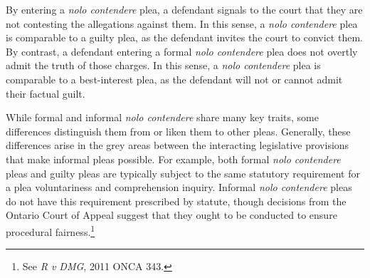 By entering a \textit{nolo contendere} plea, a defendant signals to the court that they are not contesting the allegations against them. In this sense, a \textit{nolo contendere} plea is comparable to a guilty plea, as the defendant invites the court to convict them. By contrast, a defendant entering a formal \textit{nolo contendere} plea does not overtly admit the truth of those charges. In this sense, a \textit{nolo contendere} plea is comparable to a best-interest plea, as the defendant will not or cannot admit their factual guilt.

While formal and informal \textit{nolo contendere} share many key traits, some differences distinguish them from or liken them to other pleas. Generally, these differences arise in the grey areas between the interacting legislative provisions that make informal pleas possible. For example, both formal \textit{nolo contendere} pleas and guilty pleas are typically subject to the same statutory requirement for a plea voluntariness and comprehension inquiry. Informal \textit{nolo contendere} pleas do not have this requirement prescribed by statute, though decisions from the Ontario Court of Appeal suggest that they ought to be conducted to ensure procedural fairness.\footnote{See \textit{R v DMG}, 2011 ONCA 343.}